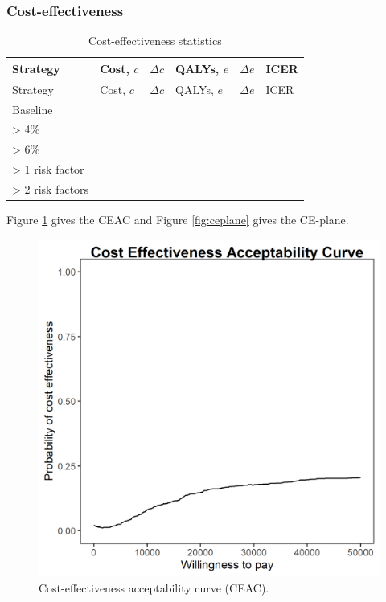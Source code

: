 \documentclass[
]{article}
\begin{document}
\hypertarget{cost-effectiveness}{%
\subsubsection{Cost-effectiveness}\label{cost-effectiveness}}

\begin{longtable}[]{@{}llllll@{}}
\caption{Cost-effectiveness statistics}\tabularnewline
\toprule
Strategy & Cost, \(c\) & \(\Delta c\) & QALYs, \(e\) & \(\Delta e\) & ICER \\
\midrule
\endfirsthead
\toprule
Strategy & Cost, \(c\) & \(\Delta c\) & QALYs, \(e\) & \(\Delta e\) & ICER \\
\midrule
\endhead
Baseline & & & & & \\
\textgreater{} 4\% & & & & & \\
\textgreater{} 6\% & & & & & \\
\textgreater{} 1 risk factor & & & & & \\
\textgreater{} 2 risk factors & & & & & \\
\bottomrule
\end{longtable}

Figure \ref{fig:ceac} gives the CEAC and
Figure \ref{fig:ceplane} gives the CE-plane.

\begin{figure}

{\centering \includegraphics[width=19.22in]{../../images/ceac} 

}

\caption{Cost-effectiveness acceptability curve (CEAC).}\label{fig:ceac}
\end{figure}
\end{document}
